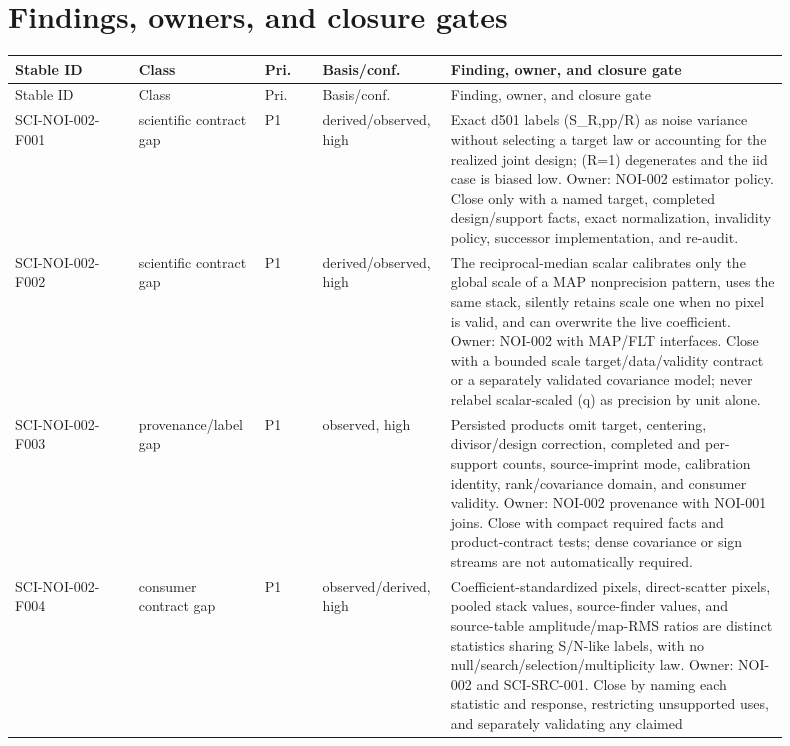 \documentclass[11pt]{article}
\begin{document}
\section{Findings, owners, and closure gates}

\begin{longtable}{L{0.15\linewidth}L{0.15\linewidth}L{0.07\linewidth}L{0.12\linewidth}L{0.41\linewidth}}
\toprule
Stable ID & Class & Pri. & Basis/conf. & Finding, owner, and closure gate\\
\midrule
\endfirsthead
\toprule
Stable ID & Class & Pri. & Basis/conf. & Finding, owner, and closure gate\\
\midrule
\endhead
SCI-NOI-002-F001 & scientific contract gap & P1 & derived/observed, high &
Exact d501 labels (S_{R,pp}/R) as noise variance without selecting a target
law or accounting for the realized joint design; (R=1) degenerates and the
iid case is biased low.  Owner: NOI-002 estimator policy.  Close only with a
named target, completed design/support facts, exact normalization, invalidity
policy, successor implementation, and re-audit.\\
SCI-NOI-002-F002 & scientific contract gap & P1 & derived/observed, high &
The reciprocal-median scalar calibrates only the global scale of a MAP
nonprecision pattern, uses the same stack, silently retains scale one when no
pixel is valid, and can overwrite the live coefficient.  Owner: NOI-002 with
MAP/FLT interfaces.  Close with a bounded scale target/data/validity contract
or a separately validated covariance model; never relabel scalar-scaled (q)
as precision by unit alone.\\
SCI-NOI-002-F003 & provenance/label gap & P1 & observed, high &
Persisted products omit target, centering, divisor/design correction,
completed and per-support counts, source-imprint mode, calibration identity,
rank/covariance domain, and consumer validity.  Owner: NOI-002 provenance with
NOI-001 joins.  Close with compact required facts and product-contract tests;
dense covariance or sign streams are not automatically required.\\
SCI-NOI-002-F004 & consumer contract gap & P1 & observed/derived, high &
Coefficient-standardized pixels, direct-scatter pixels, pooled stack values,
source-finder values, and source-table amplitude/map-RMS ratios are distinct
statistics sharing S/N-like labels, with no null/search/selection/multiplicity
law.  Owner: NOI-002 and SCI-SRC-001.  Close by naming each statistic and
response, restricting unsupported uses, and separately validating any claimed

\end{longtable}
\end{document}

